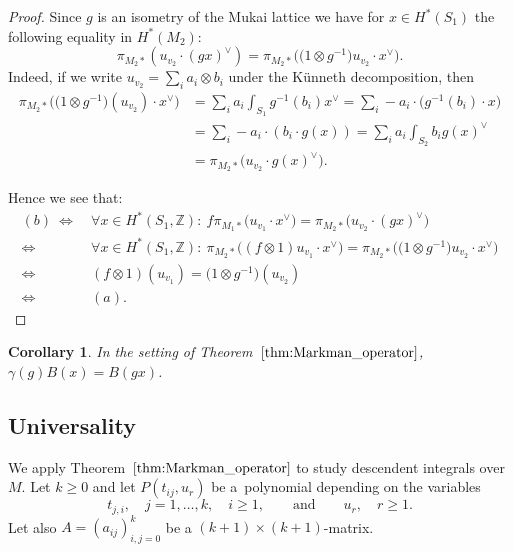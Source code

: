 \documentclass[pdftex]{sigma}
\numberwithin{equation}{section}
\newtheorem{cor}[Theorem]{Corollary}
\newcommand{\BZ}{{\mathbb{Z}}}
\newcommand{\1}{\mathsf{1}}
\begin{document}
\begin{proof}
Since $g$ is an isometry of the Mukai lattice we have for $x \in H^{\ast}(S_1)$ the following equality in $H^{\ast}(M_2)$:
\[
\pi_{M_2 \ast}(u_{v_2} \cdot (gx)^{\vee}) = \pi_{M_2 \ast}\big( \big(1 \otimes g^{-1}\big) u_{v_2} \cdot x^{\vee} \big).
\]
{\samepage
Indeed, if we write $u_{v_2} = \sum_i a_i \otimes b_i$ under the K\"unneth decomposition, then
\begin{align*}
\pi_{M_2 \ast}\big( \big(1 \otimes g^{-1}\big)( u_{v_2} ) \cdot x^{\vee} \big)
& = \sum_i a_i \int_{S_1} g^{-1}(b_i) x^{\vee}
 = \sum_i -a_i \cdot \big(g^{-1}(b_i) \cdot x\big) \\
& = \sum_i -a_i \cdot (b_i \cdot g(x))  = \sum_i a_i \int_{S_2} b_i g(x)^{\vee} \\
& =  \pi_{M_2 \ast}\big( u_{v_2} \cdot g(x)^{\vee} \big).
\end{align*}}

Hence we see that:
\begin{align*}
(b) \ \Longleftrightarrow \ & \forall x \in H^{\ast}(S_1, \BZ) \colon \ f \pi_{M_1 \ast}\big(u_{v_1} \cdot x^{\vee}\big) = \pi_{M_2 \ast}\big( u_{v_2} \cdot (gx)^{\vee} \big) \\
\Longleftrightarrow\ & \forall x \in H^{\ast}(S_1, \BZ) \colon \ \pi_{M_2 \ast}\big( (f \otimes 1)u_{v_1} \cdot x^{\vee} \big) = \pi_{M_2 \ast}\big( \big(1 \otimes g^{-1}\big)u_{v_2} \cdot x^{\vee} \big) \\
\Longleftrightarrow\ & (f \otimes 1)(u_{v_1}) = \big(1 \otimes g^{-1}\big)(u_{v_2}) \\
\Longleftrightarrow\ & (a).
\tag*{\qed}
\end{align*}
\renewcommand{\qed}{}
\end{proof}


\begin{cor} \label{corX}
In the setting of Theorem~$\ref{thm:Markman_operator}$, $\gamma(g) B(x) = B(gx)$.
\end{cor}


\subsection{Universality}
We apply Theorem~$\ref{thm:Markman_operator}$ to study descendent integrals over $M$.
Let $k \geq 0$ and let $P(t_{ij}, u_r)$ be a~polynomial depending on the variables
\[
t_{j,i}, \quad j = 1, \dots, k, \quad i \geq 1, \qquad \text{and} \qquad u_r, \quad r \geq 1.
\]
Let also $A = (a_{ij})_{i,j=0}^{k}$ be a $(k+1) \times (k+1)$-matrix.
\end{document}

